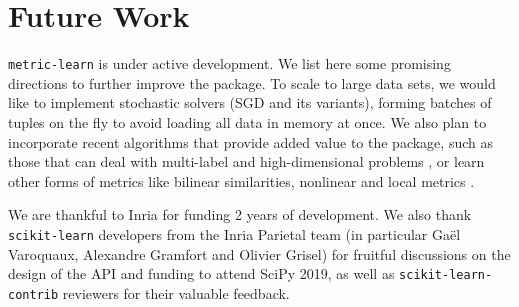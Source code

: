 \documentclass[twoside,11pt]{article}
\newcommand{\aurelien}[1]{\todo[inline,caption={},color=orange!40]{{\it Aurelien:~}#1}}
\newcommand{\william}[1]{\todo[inline,caption={},color=blue!40]{{\it William:~}#1}}
\begin{document}



\section{Future Work}

\texttt{metric-learn} is under active development. We list here some promising directions to further improve the package. To scale to large data sets, we would like to implement stochastic solvers (SGD and its variants), forming batches of tuples on the fly to avoid loading all data in memory at once. %
We also plan to incorporate recent algorithms that provide added value to the package, such as those that can deal with multi-label \citep{liu15} and high-dimensional problems \citep{Liu19}, or learn other forms of metrics like bilinear similarities, nonlinear and local metrics \citep[see][for a survey]{Bellet15}.

\acks

We are thankful to Inria for funding 2 years of development. We also thank \texttt{scikit-learn} developers from the Inria Parietal team (in particular Gaël Varoquaux, Alexandre Gramfort and Olivier Grisel) for fruitful discussions on the design of the API and funding to attend SciPy 2019, as well as \texttt{scikit-learn-contrib} reviewers for their valuable feedback.





\end{document}
